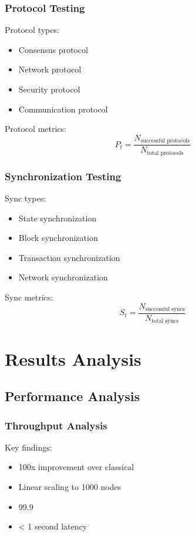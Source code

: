 \documentclass[12pt]{article}
\begin{document}
\subsubsection{Protocol Testing}

Protocol types:
\begin{itemize}
\item Consensus protocol
\item Network protocol
\item Security protocol
\item Communication protocol
\end{itemize}

Protocol metrics:
\begin{equation}
P_t = \frac{N_{\text{successful protocols}}}{N_{\text{total protocols}}}
\end{equation}

\subsubsection{Synchronization Testing}

Sync types:
\begin{itemize}
\item State synchronization
\item Block synchronization
\item Transaction synchronization
\item Network synchronization
\end{itemize}

Sync metrics:
\begin{equation}
S_t = \frac{N_{\text{successful syncs}}}{N_{\text{total syncs}}}
\end{equation}

\section{Results Analysis}

\subsection{Performance Analysis}

\subsubsection{Throughput Analysis}

Key findings:
\begin{itemize}
\item 100x improvement over classical
\item Linear scaling to 1000 nodes
\item 99.9%
\item < 1 second latency
\end{itemize}
\end{document}
